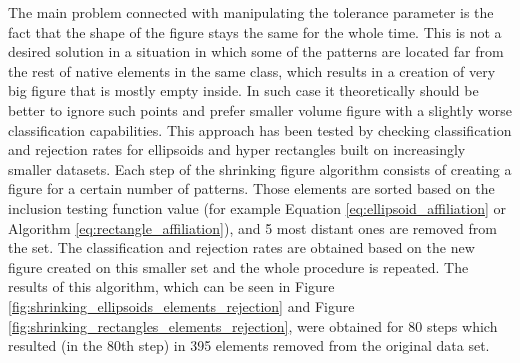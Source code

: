 The main problem connected with manipulating the tolerance parameter is the fact that the shape of the figure stays the same for the whole time. This is not a desired solution in a situation in which some of the patterns are located far from the rest of native elements in the same class, which results in a creation of very big figure that is mostly empty inside. In such case it theoretically should be better to ignore such points and prefer smaller volume figure with a slightly worse classification capabilities. This approach has been tested by checking classification and rejection rates for ellipsoids and hyper rectangles built on increasingly smaller datasets. Each step of the shrinking figure algorithm consists of creating a figure for a certain number of patterns. Those elements are sorted based on the inclusion testing function value (for example Equation \ref{eq:ellipsoid_affiliation} or Algorithm \ref{eq:rectangle_affiliation}), and 5 most distant ones are removed from the set. The classification and rejection rates are obtained based on the new figure created on this smaller set and the whole procedure is repeated. The results of this algorithm, which can be seen in Figure \ref{fig:shrinking_ellipsoids_elements_rejection} and Figure \ref{fig:shrinking_rectangles_elements_rejection}, were obtained for 80 steps which resulted (in the 80th step) in 395 elements removed from the original data set.

